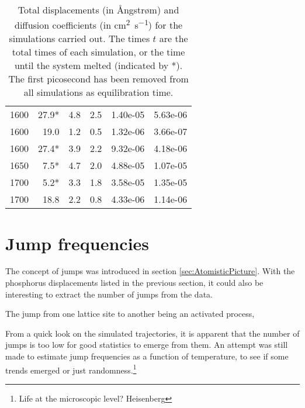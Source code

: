 \documentclass[11pt,bibliography=totoc,index=totoc]{scrbook}   %
\begin{document}
\begin{table}[htbp]
\begin{tabular}{rrrrrr}
         1600 & 27.9* &  4.8 &  2.5 & 1.40e-05 & 5.63e-06 \\
         1600 & 19.0  &  1.2 &  0.5 & 1.32e-06 & 3.66e-07 \\
         1600 & 27.4* &  3.9 &  2.2 & 9.32e-06 & 4.18e-06 \\
         1650 &  7.5* &  4.7 &  2.0 & 4.88e-05 & 1.07e-05 \\
         1700 &  5.2* &  3.3 &  1.8 & 3.58e-05 & 1.35e-05 \\
         1700 & 18.8  &  2.2 &  0.8 & 4.33e-06 & 1.14e-06 \\
    \bottomrule
  \end{tabular}
  \caption{Total displacements (in Ångstrøm) and diffusion coefficients (in \si{\centi\metre\squared\per\second}) 
    for the simulations carried out. 
    The times $t$ are the total times of each simulation, or the time until the system melted (indicated by *).
    The first picosecond has been removed from all simulations as equilibration time.}
  \label{tab:displacements}
\end{table}



%
\section{Jump frequencies}
%

The concept of jumps was introduced in section \ref{sec:AtomisticPicture}. 
With the phosphorus displacements listed in the previous section, it could also be interesting to extract the number of jumps from the data.

The jump from one lattice site to another being an activated process, 

From a quick look on the simulated trajectories, it is apparent that the number of jumps is too low for good statistics to emerge from them.
An attempt was still made to estimate jump frequencies as a function of temperature, to see if some trends emerged or just randomness.\footnote{
Life at the microscopic level? Heisenberg}
\end{document}
